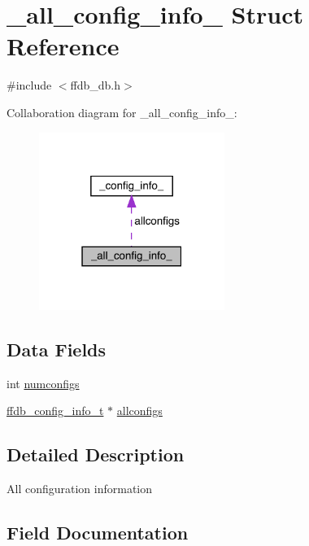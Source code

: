 \hypertarget{struct__all__config__info__}{}\section{\+\_\+all\+\_\+config\+\_\+info\+\_\+ Struct Reference}
\label{struct__all__config__info__}


{\ttfamily \#include $<$ffdb\+\_\+db.\+h$>$}



Collaboration diagram for \+\_\+all\+\_\+config\+\_\+info\+\_\+\+:\nopagebreak
\begin{figure}[H]
\begin{center}
\leavevmode
\includegraphics[width=171pt]{d5/d68/struct__all__config__info____coll__graph}
\end{center}
\end{figure}
\subsection*{Data Fields}
\begin{DoxyCompactItemize}
\item 
int \mbox{\hyperlink{struct__all__config__info___a581857c25b21cf9e4b7f87396aefca30}{numconfigs}}
\item 
\mbox{\hyperlink{other__libs_2filedb_2filehash_2ffdb__db_8h_acc961fbd2faf6a849a1620309100fda1}{ffdb\+\_\+config\+\_\+info\+\_\+t}} $\ast$ \mbox{\hyperlink{struct__all__config__info___af6ab66605d28fe7af72fb69c4fe61a40}{allconfigs}}
\end{DoxyCompactItemize}


\subsection{Detailed Description}
All configuration information 

\subsection{Field Documentation}
\mbox{\label{struct__all__config__info___af6ab66605d28fe7af72fb69c4fe61a40}} 
